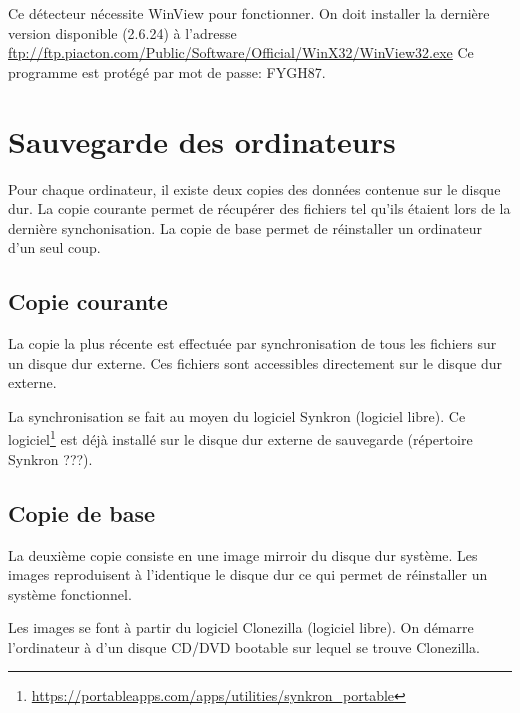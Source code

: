 \documentclass[11pt,francais]{book} %
\begin{document}
Ce détecteur nécessite WinView pour fonctionner.
On doit installer la dernière version disponible (2.6.24) à l'adresse \url{ftp://ftp.piacton.com/Public/Software/Official/WinX32/WinView32.exe}
Ce programme est protégé par mot de passe: FYGH87.



    
\section{Sauvegarde des ordinateurs}

Pour chaque ordinateur, il existe deux copies des données contenue sur le disque dur.
La copie courante permet de récupérer des fichiers tel qu'ils étaient lors de la dernière synchonisation.
La copie de base permet de réinstaller un ordinateur d'un seul coup.

\subsection{Copie courante}
La copie la plus récente est effectuée par synchronisation de tous les fichiers sur un disque dur externe.
Ces fichiers sont accessibles directement sur le disque dur externe.

La synchronisation se fait au moyen du logiciel Synkron (logiciel libre).
Ce logiciel\footnote{\url{https://portableapps.com/apps/utilities/synkron_portable}} est déjà installé sur le disque dur externe de sauvegarde (répertoire Synkron ???).




\subsection{Copie de base}
La deuxième copie consiste en une image mirroir du disque dur système.
Les images reproduisent à l'identique le disque dur ce qui permet de réinstaller un système fonctionnel.

Les images se font à partir du logiciel Clonezilla (logiciel libre).
On démarre l'ordinateur à d'un disque CD/DVD bootable sur lequel se trouve Clonezilla.
\end{document}
